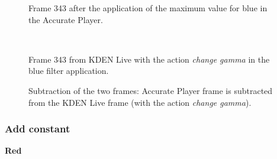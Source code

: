 \documentclass[../MasterThesis.tex]{subfiles}
\begin{document}
\begin{minipage}{0.48\textwidth}
	\begin{figure}[H]
		\begin{center}
			\caption[]{Frame 343 after the application of the maximum value for blue in the Accurate Player.}
		\end{center}
	\end{figure}
\end{minipage}\begin{minipage}{0.04\textwidth}
	\ 
\end{minipage}\begin{minipage}{0.48\textwidth}
	\begin{figure}[H]
		\begin{center}
			\caption[]{Frame 343 from KDEN Live with the action \textit{change gamma} in the blue filter application.}
		\end{center}
	\end{figure}
\end{minipage}

\vspace*{-1em}

\begin{figure}[H]
	\begin{center}
		\caption[]{Subtraction of the two frames: Accurate Player frame is subtracted from the KDEN Live frame (with the action \textit{change gamma}).}
	\end{center}
\end{figure}















\subsubsection*{Add constant}


\vspace*{-1em}

\textbf{Red}

\vspace*{-1em}
\end{document}
